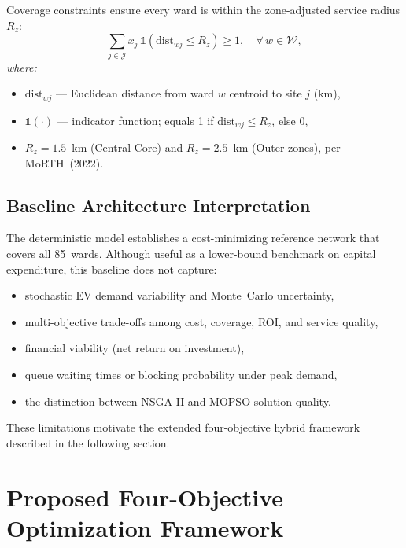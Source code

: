 \medskip\noindent
Coverage constraints ensure every ward is within the zone-adjusted
service radius $R_z$:
\begin{equation}
\sum_{j \in \mathcal{J}} x_j \,\mathbb{1}
\!\left(\mathrm{dist}_{wj} \leq R_z\right) \geq 1,
\quad \forall\, w \in \mathcal{W},
\label{eq:coverage}
\end{equation}
\textit{where:}
\begin{itemize}
  \item $\mathrm{dist}_{wj}$ — Euclidean distance from ward $w$ centroid
        to site $j$ (km),
  \item $\mathbb{1}(\cdot)$ — indicator function; equals 1 if
        $\mathrm{dist}_{wj}\leq R_z$, else 0,
  \item $R_z = 1.5$~km (Central Core) and $R_z = 2.5$~km (Outer zones),
        per MoRTH~(2022).
\end{itemize}

\subsection{Baseline Architecture Interpretation}

The deterministic model establishes a cost-minimizing reference network that
covers all 85~wards. Although useful as a lower-bound benchmark on capital
expenditure, this baseline does not capture:

\begin{itemize}
    \item stochastic EV demand variability and Monte~Carlo uncertainty,
    \item multi-objective trade-offs among cost, coverage, ROI, and
          service quality,
    \item financial viability (net return on investment),
    \item queue waiting times or blocking probability under peak demand,
    \item the distinction between NSGA-II and MOPSO solution quality.
\end{itemize}

\noindent
These limitations motivate the extended four-objective hybrid framework
described in the following section.

\section{Proposed Four-Objective Optimization Framework}
\label{sec:hybrid_framework}


